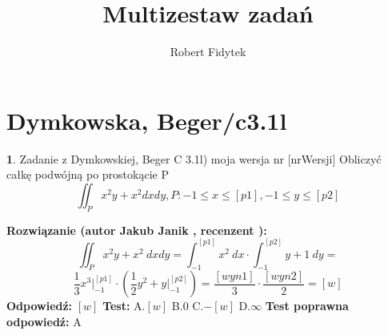 \documentclass[12pt, a4paper]{article}
\title{Multizestaw zadań}
\author{Robert Fidytek}
\date{}
\theoremstyle{definition} %
\newtheorem{zad}{}
\newcommand{\kategoria}[1]{\section{#1}} %
\newcommand{\zadStart}[1]{\begin{zad}#1\newline} %
\newcommand{\zadStop}{\end{zad}}   %
\newcommand{\rozwStart}[2]{\noindent \textbf{Rozwiązanie (autor #1 , recenzent #2): }\newline} %
\newcommand{\rozwStop}{\newline}                                            %
\newcommand{\odpStart}{\noindent \textbf{Odpowiedź:}\newline}    %
\newcommand{\odpStop}{\newline}                                             %
\newcommand{\testStart}{\noindent \textbf{Test:}\newline} %
\newcommand{\testStop}{\newline} %
\newcommand{\kluczStart}{\noindent \textbf{Test poprawna odpowiedź:}\newline} %
\newcommand{\kluczStop}{\newline} %
\begin{document}
\maketitle


\kategoria{Dymkowska, Beger/c3.1l}
\zadStart{Zadanie z Dymkowskiej, Beger C 3.1l) moja wersja nr [nrWersji]}
Obliczyć całkę podwójną po prostokącie P $$\iint_P x^2y+x^2 dxdy, P: -1\leq x \leq [p1], -1 \leq y \leq [p2]$$
\zadStop
\rozwStart{Jakub Janik}{}
$$\iint_P x^2y+x^2\ dxdy=\int_{-1}^{[p1]}x^2\ dx \cdot \int_{-1}^{[p2]}y+1\ dy=$$
$$\frac{1}{3}x^3\Big|_{-1}^{[p1]}\cdot(\frac{1}{2}y^2+y\Big|_{-1}^{[p2]})=\frac{[wyn1]}{3}\cdot\frac{[wyn2]}{2}=[w]$$
\rozwStop
\odpStart
$[w]$
\odpStop
\testStart
A.$[w]$
B.$0$
C.$-[w]$
D.$\infty$
\testStop
\kluczStart
A
\kluczStop
\end{document}
